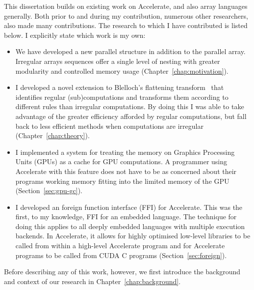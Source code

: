 This dissertation builds on existing work on Accelerate, and also array languages generally. Both prior to and during my contribution, numerous other researchers, also made many contributions. The research to which I have contributed is listed below. I explicitly state which work is my own:

\begin{itemize}
\item We have developed a new parallel structure in addition to the parallel array. Irregular arrays sequences offer a single level of nesting with greater modularity and controlled memory usage (Chapter~\ref{chap:motivation}).
\item I developed a novel extension to Blelloch's flattening transform~\cite{Blelloch:compiling1988,Blelloch:nesl1995} that identifies regular (sub)computations and transforms them according to different rules than irregular computations. By doing this I was able to take advantage of the greater efficiency afforded by regular computations, but fall back to less efficient methods when computations are irregular (Chapter~\ref{chap:theory}).
\item I implemented a system for treating the memory on Graphics Processing Units (GPUs) as a cache for GPU computations. A programmer using Accelerate with this feature does not have to be as concerned about their programs working memory fitting into the limited memory of the GPU (Section~\ref{sec:gpu-gc}).
\item I developed an foreign function interface (FFI) for Accelerate. This was the first, to my knowledge, FFI for an embedded language. The technique for doing this applies to all deeply embedded languages with multiple execution backends. In Accelerate, it allows for highly optimised low-level libraries to be called from within a high-level Accelerate program and for Accelerate programs to be called from CUDA C programs (Section~\ref{sec:foreign}).
\end{itemize}

Before describing any of this work, however, we first introduce the background and context of our research in Chapter~\ref{chap:background}.
